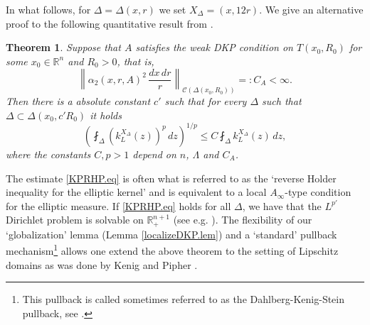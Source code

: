 \documentclass[11pt, a4paper,leqno]{amsart}
\theoremstyle{plain}
\newtheorem{theorem}[equation]{Theorem}
\theoremstyle{definition}
\theoremstyle{remark}
\numberwithin{equation}{section}
\newcommand{\rn}{\mathbb{R}^n}
\newcommand{\ree}{\mathbb{R}^{n+1}}
\begin{document}
In what follows, for $\Delta = \Delta(x,r)$ we set $X_{\Delta} = (x, 12r)$. We give an alternative proof to the following quantitative result from \cite{KP}.
\begin{theorem}\label{KPRThrm.eq}
Suppose that $A$ satisfies the weak DKP condition on $T(x_0,R_0)$ for some $x_0 \in \rn$ and $R_0  > 0$, that is,
\[\left\| \alpha_2(x,r,A)^2 \, \frac{dx \, dr}{r}\right\|_{\mathcal{C}(\Delta(x_0,R_0))} =: C_A < \infty.\] 
Then there is a absolute constant $c'$ such that for every $\Delta$ such that $\Delta \subset \Delta(x_0, c'R_0)$ it holds 
\begin{equation}\label{KPRHP.eq}
\left(\fint_{\Delta} (k^{X_\Delta}_L(z))^p \,dz \right)^{1/p} \le C \fint_{\Delta} k^{X_\Delta}_L(z) \, dz,
\end{equation}
where the constants $C, p > 1$ depend on $n$, $\Lambda$ and $C_A$.
\end{theorem}
The estimate \eqref{KPRHP.eq} is often what is referred to as the `reverse Holder inequality for the elliptic kernel' and is equivalent to a local $A_\infty$-type condition for the elliptic measure. If \eqref{KPRHP.eq} holds for all $\Delta$, we have that the $L^{p'}$ Dirichlet problem is solvable on $\ree_+$ (see e.g. \cite[Proposition 4.5]{HofPLe}). The flexibility of our `globalization' lemma (Lemma \ref{localizeDKP.lem}) and a `standard' pullback mechanism\footnote{This pullback is called sometimes referred to as the Dahlberg-Kenig-Stein pullback, see \cite{KP, Dahlpullback}.} allows one extend the above theorem to the setting of Lipschitz domains as was done by Kenig and Pipher \cite{KP}. 
\end{document}
